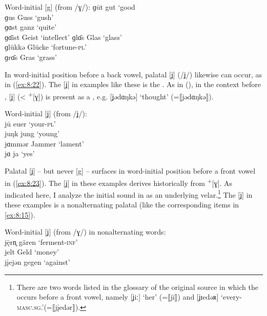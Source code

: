 \ea%
\label{ex:8:21}Word-initial [g] (from /ɣ/):
\ea\label{ex:8:21a} ɡūt    \tab [guːt]   \tab gut    \tab ‘good   \\
    ɡus    \tab [gus]    \tab Guss   \tab ‘gush’  \\
    ɡɑst   \tab [gɑns]   \tab ganz   \tab ‘quite’ \\
    ɡɑ̄ist  \tab [gɑːist] \tab Geist  \tab ‘intellect’ 
\ex\label{ex:8:21b} ɡlɑ̄s   \tab [glɑːs]  \tab Glas   \tab ‘glass’     \\
    ɡlükkə \tab [glʏkə]  \tab Glücke \tab ‘fortune\textsc{{}-pl}’ \\
    ɡrɑ̄s   \tab [gʀɑːs]  \tab Gras   \tab ‘grass’ 
    \z
\z 

In word-initial position before a back vowel, palatal [ʝ] (/ʝ/) likewise can occur, as in (\ref{ex:8:22}). The [ʝ] in examples like these is the . As in  (), in the context before , [ʝ] (< \textsuperscript{+}[ɣ]) is present as a , e.g. [ʝədɑŋkə] ‘thought’ (=⟦jədɑŋkə⟧).

\ea \label{ex:8:22}  Word-initial [ʝ] (from /ʝ/):\\
jū \tab [ʝuː] \tab euer \tab ‘your\textsc{{}-pl}’ \\
juŋk \tab [ʝʊŋk] \tab jung \tab ‘young’ \\
jɑmmər \tab [ʝɑməʀ] \tab Jammer \tab ‘lament’ \\
jɑ \tab [ʝɑː] \tab ja \tab ‘yes’ 
\z 

Palatal [ʝ] -- but never [g] -- surfaces in word-initial position before a front vowel in (\ref{ex:8:23}). The [ʝ] in these examples derives historically from  \textsuperscript{+}[ɣ]. As indicated here, I analyze the initial sound in  as an underlying velar.\footnote{{There are two words listed in the glossary of the original source  \citep[115--127]{Hille1939} in which the  occurs before a front vowel, namely [ʝiː] ‘her’ (=⟦jī⟧) and [ʝɪedəʀ] ‘every}\textrm{\textsc{{}-masc.sg}}.\textrm{’(=⟦j\k{i}edər⟧).}} The [ʝ] in these examples is a nonalternating palatal (like the corresponding  items in \ref{ex:8:15}).

\ea%
\label{ex:8:23}Word-initial [ʝ] (from /ɣ/) in nonalternating words:\\
  j\={ę}rn̥ \tab [ʝɛːʀn̩] \tab gären \tab ‘ferment\textsc{{}-inf}’ \\
  jelt \tab [ʝɛlt] \tab Geld \tab ‘money’ \\
  j\k{i}ejən \tab [ʝɪeʝən] \tab gegen \tab ‘against’ 
\z 

